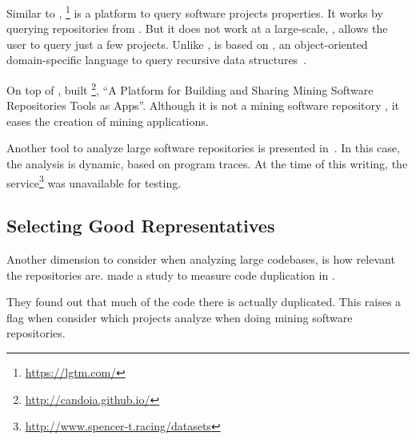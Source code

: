 Similar to \boa{}, \lgtm{}\footnote{\url{https://lgtm.com/}} is a platform to query software projects properties.
It works by querying repositories from \github{}.
But it does not work at a large-scale, \ie{}, \lgtm{} allows the user to query just a few projects.
Unlike \boa{}, \lgtm{} is based on \ql{}, an object-oriented domain-specific language to query recursive data structures~\cite{avgustinov_ql:_2016}.

On top of \boa{}, \cite{tiwari_candoia:_2017} built \candoia{}\footnote{\url{http://candoia.github.io/}}, ``A Platform for Building and Sharing Mining Software Repositories Tools as Apps''.
Although it is not a mining software repository \perse{}, it eases the creation of mining applications.

Another tool to analyze large software repositories is presented in~\cite{brandauer_spencer:_2017}.
In this case, the analysis is dynamic, based on program traces.
At the time of this writing, the service\footnote{\url{http://www.spencer-t.racing/datasets}} was unavailable for testing.


\subsection*{Selecting Good Representatives}

Another dimension to consider when analyzing large codebases, is how relevant the repositories are.
\cite{lopes_dejavu:_2017} made a study to measure code duplication in \github{}.

They found out that much of the code there is actually duplicated.
This raises a flag when consider which projects analyze when doing mining software repositories.







